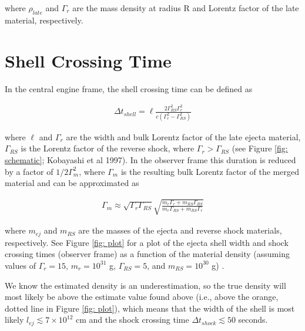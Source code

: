 \documentclass[linenumbers,twocolumn]{aastex631}
\begin{document}
where $\rho_{late}$ and $\Gamma_r$ are the mass density at radius R and Lorentz factor of the late material, respectively.

\section{Shell Crossing Time}  

In the central engine frame, the shell crossing time can be defined as

\begin{align}
    \Delta t_{shell} = \ell \frac{2\Gamma_{RS}^2\Gamma_{r}^2}{c(\Gamma_{r}^2 - \Gamma_{RS}^2)}
\end{align}

where $\ell$ and $\Gamma_{r}$ are the width and bulk Lorentz factor of the late ejecta material, $\Gamma_{RS}$ is the Lorentz factor of the reverse shock, where $\Gamma_r > \Gamma_{RS}$ (see Figure \ref{fig: schematic}; Kobayashi et al 1997). In the observer frame this duration is reduced by a factor of $1/2\Gamma_m^2$, where $\Gamma_m$ is the resulting bulk Lorentz factor of the merged material and can be approximated as 

\begin{align}
    \Gamma_m \approx \sqrt{\Gamma_{r}\Gamma_{RS}}\sqrt{\frac{m_{r}\Gamma_{r} + m_{RS}\Gamma_{RS}}{m_{r}\Gamma_{RS} + m_{RS}\Gamma_{r}}}
\end{align}

where $m_{ej}$ and $m_{RS}$ are the masses of the ejecta and reverse shock materials, respectively. See Figure \ref{fig: plot} for a plot of the ejecta shell width and shock crossing times (observer frame) as a function of the material density (assuming values of $\Gamma_{r}=15$, $m_{r}=10^{31}$ g, $\Gamma_{RS}=5$, and $m_{RS}=10^{30}$ g) . 

We know the estimated density is an underestimation, so the true density will most likely be above the estimate value found above (i.e., above the orange, dotted line in Figure \ref{fig: plot}), which means that the width of the shell is most likely $l_{ej}\lesssim 7\times 10^{12}$ cm and the shock crossing time $\Delta t_{shock} \lesssim 50$ seconds.
\end{document}
